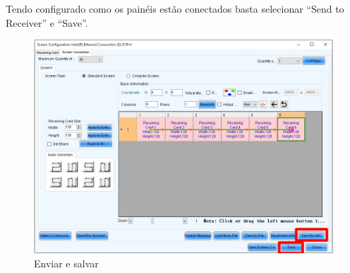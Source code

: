 \documentclass[12pt, a4paper]{article}
\begin{document}
\newpage
Tendo configurado como os painéis estão conectados basta selecionar ``Send to Receiver'' e ``Save''.
\begin{figure}[!htb]
	\centering
	\includegraphics[width=\textwidth]{conexaoCp.jpeg}
	\caption{\label{fig:}Enviar e salvar}
\end{figure}

\cleardoublepage

\end{document}
